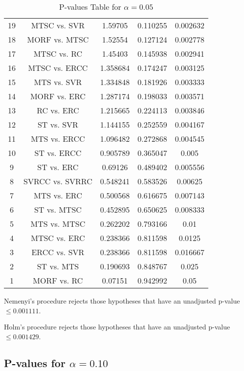 \documentclass[a4paper,10pt]{article}
\begin{document}
\begin{landscape}
\begin{table}[!htp]
\begin{tabular}{ccccc}
19&MTSC vs. SVR&1.59705&0.110255&0.002632\\
18&MORF vs. MTSC&1.52554&0.127124&0.002778\\
17&MTSC vs. RC&1.45403&0.145938&0.002941\\
16&MTSC vs. ERCC&1.358684&0.174247&0.003125\\
15&MTS vs. SVR&1.334848&0.181926&0.003333\\
14&MORF vs. ERC&1.287174&0.198033&0.003571\\
13&RC vs. ERC&1.215665&0.224113&0.003846\\
12&ST vs. SVR&1.144155&0.252559&0.004167\\
11&MTS vs. ERCC&1.096482&0.272868&0.004545\\
10&ST vs. ERCC&0.905789&0.365047&0.005\\
9&ST vs. ERC&0.69126&0.489402&0.005556\\
8&SVRCC vs. SVRRC&0.548241&0.583526&0.00625\\
7&MTS vs. ERC&0.500568&0.616675&0.007143\\
6&ST vs. MTSC&0.452895&0.650625&0.008333\\
5&MTS vs. MTSC&0.262202&0.793166&0.01\\
4&MTSC vs. ERC&0.238366&0.811598&0.0125\\
3&ERCC vs. SVR&0.238366&0.811598&0.016667\\
2&ST vs. MTS&0.190693&0.848767&0.025\\
1&MORF vs. RC&0.07151&0.942992&0.05\\
\hline
\end{tabular}
\caption{P-values Table for $\alpha=0.05$}
\end{table}Nemenyi's procedure rejects those hypotheses that have an unadjusted p-value $\le0.001111$.

Holm's procedure rejects those hypotheses that have an unadjusted p-value $\le0.001429$.

\pagebreak

\subsection{P-values for $\alpha=0.10$}


\end{landscape}
\end{document}
